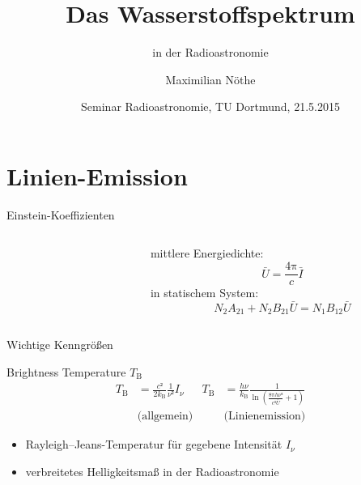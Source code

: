 \documentclass[compress, aspectratio=169]{beamer}
\author{Maximilian Nöthe}
\date[21.5.2015]{Seminar Radioastronomie, TU Dortmund, 21.5.2015}
\title{Das Wasserstoffspektrum}
\subtitle{in der Radioastronomie}
\newcommand\PI{\ensuremath{\mathup{π}}}
\newcommand\kb{\ensuremath{k_\mathup{B}}}
\newcommand\TB{\ensuremath{T_\mathup{B}}}
\begin{document}
\maketitle

\section{Linien-Emission}
\begin{frame}{Einstein-Koeffizienten}
  \begin{columns}[T, onlytextwidth]%
    \begin{column}{0.5\textwidth}%
    \end{column}%
    \begin{column}{0.45\textwidth}%
      mittlere Energiedichte:
      \begin{equation*}
        \bar{U} = \frac{4\PI}{c} \bar{I}
      \end{equation*}
      in statischem System:
      \begin{equation*}
        N_2 A_{21} + N_2 B_{21} \bar{U} = N_1 B_{12} \bar{U}
      \end{equation*}
    \end{column}%
  \end{columns}%
\end{frame}

\begin{frame}{Wichtige Kenngrößen}
  \begin{block}{Brightness Temperature $T_\mathup{B}$}
    \begin{align*}%
      \TB &= \frac{c²}{2 \kb} \frac{1}{ν²} I_ν & 
      \TB &= \frac{h ν}{k_\mathup{B}}
             \frac{1}{\ln\!\left(
                \frac{8\PI h ν³}{c³\bar{U}} + 1
             \right)} \\
      &\text{(allgemein)} &  &\text{(Linienemission)}
    \end{align*}%
  \begin{itemize}
    \item Rayleigh–Jeans-Temperatur für gegebene Intensität $I_ν$
    \item verbreitetes Helligkeitsmaß in der Radioastronomie
  \end{itemize}
  \end{block}%
\end{frame}
\end{document}
